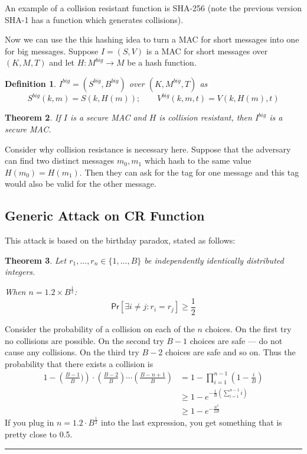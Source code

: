 \documentclass[twoside]{article}
\newcounter{lecnum}
\newtheorem{theorem}{Theorem}[lecnum]
\newtheorem{definition}[theorem]{Definition}
\newenvironment{proof}{{\bf Proof:}}{\hfill\rule{2mm}{2mm}}
\def\Pr{\mathsf{Pr}}
\begin{document}
An example of a collision resistant function is SHA-256 (note the previous version SHA-1 has a function  which generates collisions).

Now we can use the this hashing idea to turn a MAC for short messages into one for big messages. Suppose $I = (S, V)$ is a MAC for short messages over $(K, M, T)$ and let $H: M^{big} \rightarrow M$ be a hash function. 

\begin{definition}
$I^{big} = (S^{big}, B^{big})$ over $(K, M^{big}, T)$ as
\[S^{big}(k, m) = S(k, H(m)); \qquad V^{big}(k, m, t) = V(k, H(m), t)\]
\end{definition}

\begin{theorem}
If $I$ is a secure MAC and $H$ is collision resistant, then $I^{big}$ is a secure MAC.
\end{theorem}

Consider why collision resistance is necessary here. Suppose that the adversary can find two distinct messages $m_0, m_1$ which hash to the same value $H(m_0) = H(m_1)$. Then they can ask for the tag for one message and this tag would also be valid for the other message.

\subsection{Generic Attack on CR Function} 

This attack is based on the birthday paradox, stated as follows:

\begin{theorem}
Let $r_1, ..., r_n \in \{1, ..., B\}$ be independently identically distributed integers.

When $n = 1.2 \times B^{\frac{1}{2}}$:
\[\Pr[\exists i\neq j: r_i = r_j] \geq \frac{1}{2}\]
\end{theorem}
\begin{proof}
Consider the probability of a collision on each of the $n$ choices. On the first try no collisions are possible. On the second try $B-1$ choices are safe --- do not cause any collisions. On the third try $B-2$ choices are safe and so on. Thus the probability that there exists a collision is
\begin{align*}
1 - \left(\frac{B-1}{B})\right) \cdot \left(\frac{B-2}{B}\right) \cdots \left(\frac{B-n+1}{B}\right) &= 1 - \prod_{i=1}^{n-1}\left( 1 - \frac{i}{B} \right) \\
&\geq 1 - e^{-\frac{1}{B}\left( \sum
_{i=1}^{n-1} i\right)} \\
&\geq 1 - e^{-\frac{n^2}{2B}}
\end{align*}
If you plug in $n = 1.2 \cdot B^{\frac{1}{2}}$ into the last expression, you get something that is pretty close to 0.5.
\end{proof}
\end{document}
